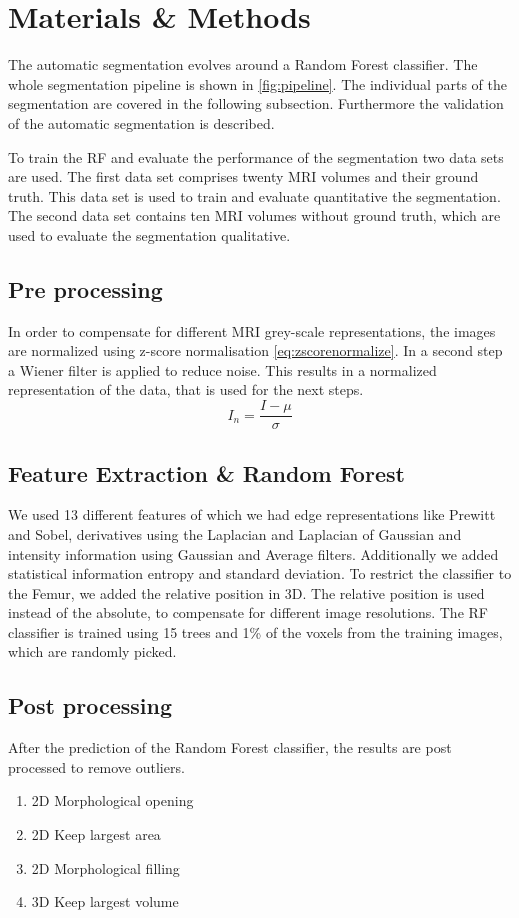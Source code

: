 \section{Materials \& Methods}
The automatic segmentation evolves around a Random Forest classifier. The whole segmentation pipeline is shown in \autoref{fig:pipeline}. The individual parts of the segmentation are covered in the following subsection. Furthermore the validation of the automatic segmentation is described.

To train the RF and evaluate the performance of the segmentation two data sets are used. The first data set comprises twenty MRI volumes and their ground truth. This data set is used to train and evaluate quantitative the segmentation. The second data set contains ten MRI volumes without ground truth, which are used to evaluate the segmentation qualitative.
\subsection{Pre processing}
In order to compensate for different MRI grey-scale representations, the images are normalized using z-score normalisation  \autoref{eq:zscorenormalize}. In a second step a Wiener filter is applied to reduce noise. This results in a normalized representation of the data, that is used for the next steps.
\begin{equation}
I_n = \frac{I - \mu}{\sigma}
\label{eq:zscorenormalize}
\end{equation}
\subsection{Feature Extraction \& Random Forest}
We used 13 different features of which we had edge representations like Prewitt and Sobel, derivatives using the Laplacian and Laplacian of Gaussian and intensity information using Gaussian and Average filters. Additionally we added statistical information entropy and standard deviation. To restrict the classifier to the Femur, we added the relative position in 3D. The relative position is used instead of the absolute, to compensate for different image resolutions.
The RF classifier is trained using 15 trees and 1\% of the voxels from the training images, which are randomly picked. 
\subsection{Post processing}
After the prediction of the Random Forest classifier, the results are post processed to remove outliers. 
\begin{enumerate}
\item 2D Morphological opening
\item 2D Keep largest area
\item 2D Morphological filling
\item 3D Keep largest volume
\end{enumerate}

